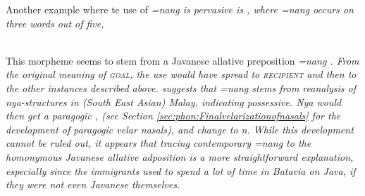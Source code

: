 Another example where te use of \em =nang \em is pervasive is , where \em =nang \em occurs on three words out of five,

 \\
 
This morpheme seems to stem from a Javanese allative preposition \em =nang \em\citep[151]{Slomanson2007cll}. From the original meaning of \textsc{goal}, the use would have spread to \textsc{recipient} and then to the other instances described above. \citet{Ansaldo2005santiago} suggests that \em =nang \em stems from reanalysis of \em nya\em-structures in (South East Asian) Malay, indicating possessive. \em Nya \em would then get a paragogic \ng{}, (see Section \ref{sec:phon:Finalvelarizationofnasals} for the development of paragogic velar nasals), and change \ny{} to n. While this development cannot be ruled out, it appears that tracing contemporary \em =nang \em to the homonymous Javanese allative adposition is a more straightforward explanation, especially since the immigrants used to spend a lot of time in Batavia on Java, if they were not even Javanese themselves.



